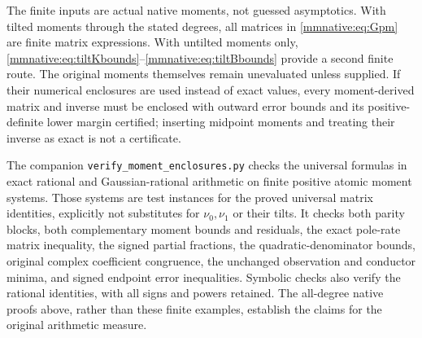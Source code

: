 The finite inputs are actual native moments, not guessed asymptotics.
With tilted moments through the stated degrees, all matrices in
\eqref{mmnative:eq:Gpm} are finite matrix expressions.  With untilted moments
only, \eqref{mmnative:eq:tiltKbounds}--\eqref{mmnative:eq:tiltBbounds} provide a second
finite route.  The original moments themselves remain unevaluated
unless supplied.  If their numerical enclosures are used instead of
exact values, every moment-derived matrix and inverse must be enclosed
with outward error bounds and its positive-definite lower margin
certified; inserting midpoint moments and treating their inverse as
exact is not a certificate.

The companion \texttt{verify\_moment\_enclosures.py} checks the
universal formulas in exact rational and Gaussian-rational arithmetic
on finite positive atomic moment systems.  Those systems are test
instances for the proved universal matrix identities, explicitly not
substitutes for $\nu_0,\nu_1$ or their tilts.  It checks both parity
blocks, both complementary moment bounds and residuals, the exact
pole-rate matrix inequality, the signed partial fractions, the
quadratic-denominator bounds, original complex coefficient congruence,
the unchanged observation and conductor minima, and signed endpoint
error inequalities.  Symbolic checks also verify the rational
identities, with all signs and powers retained.  The all-degree native
proofs above, rather than these finite examples, establish the claims
for the original arithmetic measure.

